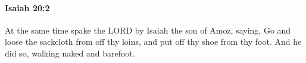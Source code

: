 
		\paragraph{Isaiah 20:2} %
			\label{ISAIAH-20-2}

			At the same time spake the LORD by Isaiah the son of Amoz, saying, Go and loose the sackcloth from off thy loins, and put off thy shoe from thy foot. And he did so, walking naked and barefoot.



